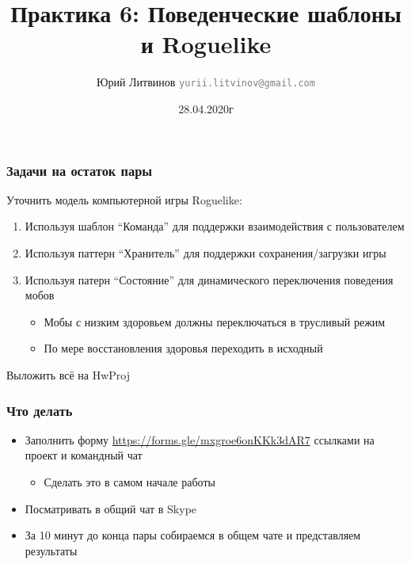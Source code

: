 \documentclass[xetex,mathserif,serif]{beamer}
\title{Практика 6: Поведенческие шаблоны и Roguelike}
\author[Юрий Литвинов]{Юрий Литвинов \newline \textcolor{gray}{\small\texttt{yurii.litvinov@gmail.com}}}
\date{28.04.2020г}
\begin{document}
    
    \frame{\titlepage}

    \begin{frame}
        \frametitle{Задачи на остаток пары}
        Уточнить модель компьютерной игры Roguelike:

        \begin{enumerate}
            \item Используя шаблон ``Команда'' для поддержки взаимодействия с пользователем
            \item Используя паттерн ``Хранитель'' для поддержки сохранения/загрузки игры
            \item Используя патерн ``Состояние'' для динамического переключения поведения мобов
            \begin{itemize}
                \item Мобы с низким здоровьем должны переключаться в трусливый режим
                \item По мере восстановления здоровья переходить в исходный
            \end{itemize}
        \end{enumerate}

        Выложить всё на HwProj
    \end{frame}

    \begin{frame}
        \frametitle{Что делать}
        \begin{itemize}
            \item Заполнить форму \url{https://forms.gle/mxgroe6onKKk3dAR7} ссылками на проект и командный чат
            \begin{itemize}
                \item Сделать это в самом начале работы
            \end{itemize}
            \item Посматривать в общий чат в Skype
            \item За 10 минут до конца пары собираемся в общем чате и представляем результаты
        \end{itemize}
    \end{frame}
\end{document}
